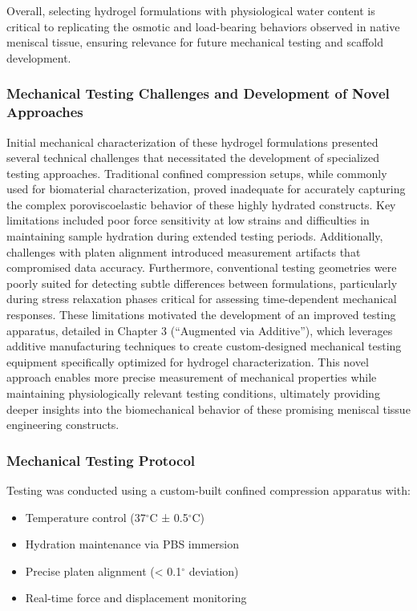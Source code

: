 Overall, selecting hydrogel formulations with physiological water content is critical to replicating the osmotic and load-bearing behaviors observed in native meniscal tissue, ensuring relevance for future mechanical testing and scaffold development.

\subsubsection{Mechanical Testing Challenges and Development of Novel Approaches}

Initial mechanical characterization of these hydrogel formulations presented several technical challenges that necessitated the development of specialized testing approaches. Traditional confined compression setups, while commonly used for biomaterial characterization, proved inadequate for accurately capturing the complex poroviscoelastic behavior of these highly hydrated constructs. Key limitations included poor force sensitivity at low strains and difficulties in maintaining sample hydration during extended testing periods. Additionally, challenges with platen alignment introduced measurement artifacts that compromised data accuracy. Furthermore, conventional testing geometries were poorly suited for detecting subtle differences between formulations, particularly during stress relaxation phases critical for assessing time-dependent mechanical responses. These limitations motivated the development of an improved testing apparatus, detailed in Chapter 3 (``Augmented via Additive''), which leverages additive manufacturing techniques to create custom-designed mechanical testing equipment specifically optimized for hydrogel characterization. This novel approach enables more precise measurement of mechanical properties while maintaining physiologically relevant testing conditions, ultimately providing deeper insights into the biomechanical behavior of these promising meniscal tissue engineering constructs.

\subsubsection{Mechanical Testing Protocol}
Testing was conducted using a custom-built confined compression apparatus with:
\begin{itemize}
    \item Temperature control (37$^\circ$C ± 0.5$^\circ$C)
    \item Hydration maintenance via PBS immersion
    \item Precise platen alignment (< 0.1$^\circ$ deviation)
    \item Real-time force and displacement monitoring
\end{itemize}


